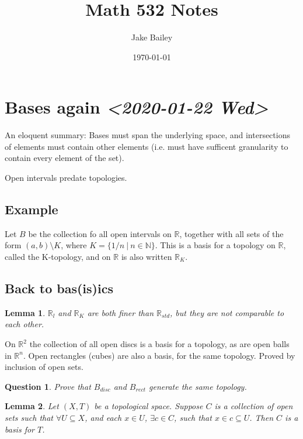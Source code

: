 \documentclass[11pt]{article}
\author{Jake Bailey}
\date{\today}
\title{Math 532 Notes}
\newtheorem{lemma}{Lemma}[section]
\newtheorem{question}{Question}[section]
\begin{document}
\maketitle
\tableofcontents


\section{Bases again \textit{<2020-01-22 Wed>}}
\label{sec:orgeed0654}

An eloquent summary: Bases must span the underlying space, and
intersections of elements must contain other elements (i.e. must have
sufficent granularity to contain every element of the set).

Open intervals predate topologies. 

\subsection{Example}
\label{sec:org639412b}
Let \(B\) be the collection fo all open intervals on \(\mathbb{R}\),
together with all sets of the form \((a,b)\setminus K\), where \(K = \{
1/n\ |\ n \in \mathbb{N}\}\). This is a basis for a topology on
\(\mathbb{R}\), called the K-topology, and on \(\mathbb{R}\) is also
written \(\mathbb{R}_K\).

\subsection{Back to bas(is)ics}
\label{sec:orgb4c069d}
\begin{lemma}
\(\mathbb{R}_l\) and \(\mathbb{R}_K\) are both finer than
\(\mathbb{R}_{std}\), but they are not comparable to each other.
\end{lemma}

On \(\mathbb{R}^2\) the collection of all open discs is a basis for a
topology, as are open balls in \(\mathbb{R}^n\). Open rectangles (cubes)
are also a basis, for the same topology. Proved by inclusion of open
sets.

\begin{question}
Prove that \(B_{disc}\) and \(B_{rect}\) generate the same topology. 
\end{question}

\begin{lemma}
Let \((X,T)\) be a topological space. Suppose \(C\) is a collection of
open sets such that \(\forall U \subseteq X\), and each \(x \in U\),
\(\exists c \in C\), such that \(x\in c \subseteq U\). Then \(C\) is a basis
for \(T\).
\end{lemma}
\end{document}
